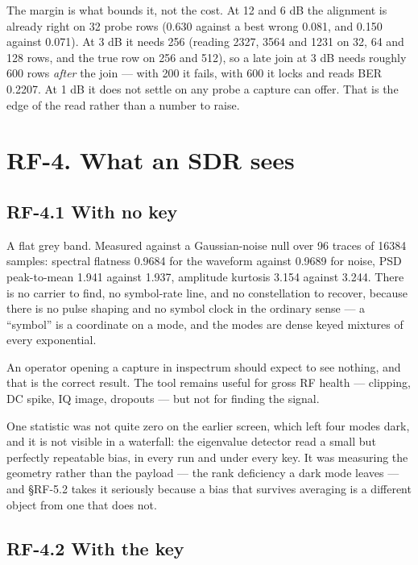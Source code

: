 \documentclass[10pt,letterpaper,twocolumn]{article}
\begin{document}
The margin is what bounds it, not the cost. At 12 and 6 dB the alignment is already right on 32 probe rows (0.630 against a best wrong 0.081, and 0.150 against 0.071). At 3 dB it needs 256 (reading 2327, 3564 and 1231 on 32, 64 and 128 rows, and the true row on 256 and 512), so a late join at 3 dB needs roughly 600 rows \emph{after} the join --- with 200 it fails, with 600 it locks and reads BER 0.2207. At 1 dB it does not settle on any probe a capture can offer. That is the edge of the read rather than a number to raise.

\section{RF-4. What an SDR sees}\label{rf-4-what-an-sdr-sees}

\subsection{RF-4.1 With no key}\label{rf-41-with-no-key}

A flat grey band. Measured against a Gaussian-noise null over 96 traces of 16384 samples: spectral flatness 0.9684 for the waveform against 0.9689 for noise, PSD peak-to-mean 1.941 against 1.937, amplitude kurtosis 3.154 against 3.244. There is no carrier to find, no symbol-rate line, and no constellation to recover, because there is no pulse shaping and no symbol clock in the ordinary sense --- a ``symbol'' is a coordinate on a mode, and the modes are dense keyed mixtures of every exponential.

An operator opening a capture in inspectrum should expect to see nothing, and that is the correct result. The tool remains useful for gross RF health --- clipping, DC spike, IQ image, dropouts --- but not for finding the signal.

One statistic was not quite zero on the earlier screen, which left four modes dark, and it is not visible in a waterfall: the eigenvalue detector read a small but perfectly repeatable bias, in every run and under every key. It was measuring the geometry rather than the payload --- the rank deficiency a dark mode leaves --- and §RF-5.2 takes it seriously because a bias that survives averaging is a different object from one that does not.

\subsection{RF-4.2 With the key}\label{rf-42-with-the-key}
\end{document}
